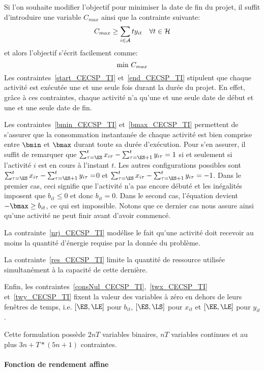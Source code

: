 Si l'on souhaite modifier l'objectif pour minimiser la date de fin
du projet, il suffit d'introduire une variable $C_{max}$ ainsi que
la contrainte suivante: 
\begin{equation} 
C_{max} \ge \sum_{i \in {\cal A}} ty_{it} \quad \forall t \in {\cal H} \notag
\end{equation} 
et alors l'objectif s'écrit facilement comme: 
\begin{equation}
\text{min } C_{max} \notag
\end{equation} 
Les contraintes~\eqref{start_CECSP_TI} et~\eqref{end_CECSP_TI}
stipulent que chaque activité est exécutée une et une seule fois
durant la durée du projet. En effet, grâce à ces contraintes, chaque
activité n'a qu'une et une seule date de début et une et une seule
date de fin.

Les contraintes~\eqref{bmin_CECSP_TI} et~\eqref{bmax_CECSP_TI}
permettent de s'assurer que la consommation instantanée de chaque
activité est bien comprise entre $\bmin$ et $\bmax$ durant toute sa
durée d'exécution. Pour s'en assurer, il suffit de remarquer que
$\sum_{\tau=\ES}^{t} x_{i\tau} -\sum_{\tau=\ES+1}^{t}y_{i\tau}=1$ si
et seulement si l'activité $i$ est en cours à l'instant $t$. Les
autres configurations possibles sont $\sum_{\tau=\ES}^{t} x_{i\tau}
-\sum_{\tau=\ES+1}^{t} y_{i\tau}=$0 et $\sum_{\tau=\ES}^{t} x_{i\tau}
-\sum_{\tau=\ES+1}^{t} y_{i\tau}=-1$. Dans le premier cas, ceci
signifie que l'activité n'a pas encore débuté et les inégalités
imposent que $b_{it} \le 0$ et donc $b_{it}=0$. Dans le second cas,
l'équation devient $-\bmax \ge b_{it}$, ce qui est impossible. Notons
que ce dernier cas nous assure ainsi qu'une activité ne peut finir avant
d'avoir commencé.

La contrainte~\eqref{nrj_CECSP_TI} modélise le fait qu'une activité
doit recevoir au moins la quantité d'énergie requise par la donnée du
problème.

La contrainte~\eqref{res_CECSP_TI} limite la quantité de ressource
utilisée simultanément à la capacité de cette dernière.

Enfin, les contraintes~\eqref{consNul_CECSP_TI},~\eqref{twx_CECSP_TI}
et~\eqref{twy_CECSP_TI} fixent la valeur des variables à zéro en
dehors de leurs fenêtres de temps, i.e. $[\ES,\LE]$ pour $b_{it}$,
$[\ES,\LS]$ pour $x_{it}$ et $[\EE,\LE]$ pour $y_{it}$.

Cette formulation possède $2nT$ variables binaires, $nT$ variables
continues et au plus $3n+T*(5n+1)$ contraintes.

\paragraph{Fonction de rendement affine}

